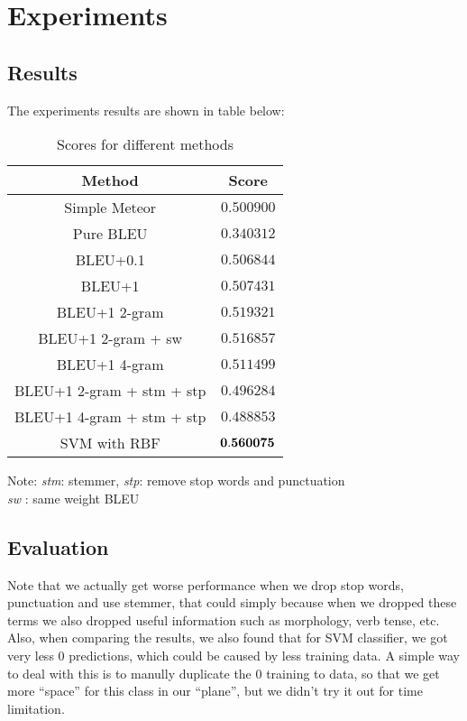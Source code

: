 \documentclass[11pt]{article}
\begin{document}
\section{Experiments} %
\label{sec:evaluation}
\subsection{Results} %
\label{sub:results}

The experiments results are shown in table below:
\begin{table}[!htf]
\centering
\begin{tabular}{ | c | c |}
\hline
Method & Score\\
\hline
Simple Meteor & $0.500900$\\
\hline
Pure BLEU & $0.340312$ \\
\hline
BLEU+0.1 & $0.506844$ \\
\hline
BLEU+1 & $0.507431$ \\
\hline
BLEU+1 2-gram& $0.519321$ \\
\hline
BLEU+1 2-gram + sw& $0.516857$ \\
\hline
BLEU+1 4-gram& $0.511499$ \\
\hline
BLEU+1 2-gram + stm + stp & $0.496284$ \\
\hline
BLEU+1 4-gram + stm + stp & $0.488853$ \\
\hline
SVM with RBF & $\bf{0.560075}$\\
\hline
\end{tabular}
\caption{Scores for different methods}
Note: \textit{stm}: stemmer, \textit{stp}: remove stop words and punctuation\\
\textit{sw} : same weight BLEU
\end{table}

\subsection{Evaluation} %
\label{sub:evaluation}
Note that we actually get worse performance when we drop stop words, punctuation and use stemmer, that could simply because when we dropped these terms we also dropped useful information such as morphology, verb tense, etc.\\
Also, when comparing the results, we also found that for SVM classifier, we got very less $0$ predictions, which could be caused by less training data. A simple way to deal with this is to manully duplicate the $0$ training to data, so that we get more ``space'' for this class in our ``plane'', but we didn't try it out for time limitation.
\end{document}
